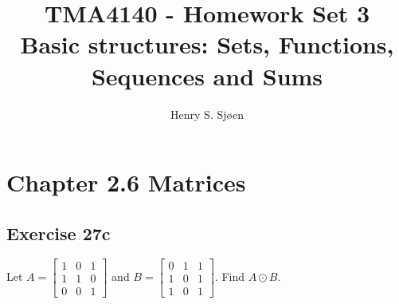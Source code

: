 \documentclass[12pt]{article}
\author{Henry S. Sjøen}
\title{
  \textbf{TMA4140 - Homework Set 3}\\
  Basic structures: Sets, Functions, Sequences and Sums\\
    \color{darkred}{\textbf{RETTES}}
  }
\begin{document}
    \maketitle
    \thispagestyle{empty}
    \tableofcontents

    \pagebreak
    \section{Chapter 2.6 Matrices}
    \subsection{Exercise 27c}
    Let
    $ A =
        \begin{bmatrix}
          1 & 0 & 1 \\
          1 & 1 & 0 \\
          0 & 0 & 1
        \end{bmatrix}
    $
    and
    $
    B =
        \begin{bmatrix}
            0&1&1\\
            1&0&1\\
            1&0&1
        \end{bmatrix}
    $. Find $A \odot B$.
\end{document}
